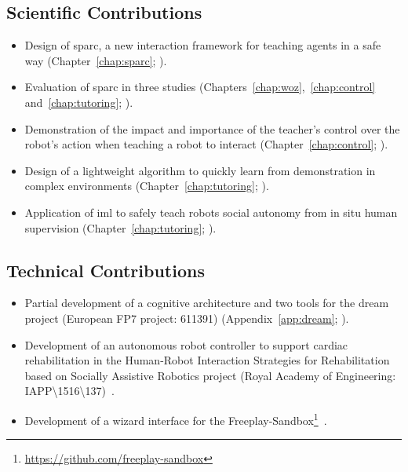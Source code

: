 \subsection{Scientific Contributions}
\begin{itemize}
	\item Design of \gls{sparc}, a new interaction framework for teaching agents in a safe way (Chapter~\ref{chap:sparc}; \citealt{senft2015human,senft2015sparc}).
	\item Evaluation of \gls{sparc} in three studies (Chapters~\ref{chap:woz},~\ref{chap:control} and~\ref{chap:tutoring}; \citealt{senft2015sparc,senft2017supervised,senft2018robots}).
	\item Demonstration of the impact and importance of the teacher's control over the robot's action when teaching a robot to interact (Chapter~\ref{chap:control}; \citealt{senft2016sparc,senft2017supervised}).
	\item Design of a lightweight algorithm to quickly learn from demonstration in complex environments (Chapter~\ref{chap:tutoring}; \citealt{senft2017toward}).
	\item Application of \gls{iml} to safely teach robots social autonomy from in situ human supervision (Chapter~\ref{chap:tutoring}; \citealt{senft2018robots}).
\end{itemize}

\subsection{Technical Contributions}
\begin{itemize}
	\item Partial development of a cognitive architecture and two tools for the \acrshort{dream} project (European FP7 project: 611391) (Appendix~\ref{app:dream}; \citep{esteban2017build}).
	\item Development of an autonomous robot controller to support cardiac rehabilitation in the Human-Robot Interaction Strategies for Rehabilitation based on Socially Assistive Robotics project (Royal Academy of Engineering: IAPP\textbackslash1516\textbackslash137)~\citep{lara2017human,casas2018social}.
	\item Development of a wizard interface for the Freeplay-Sandbox\footnote{\url{https://github.com/freeplay-sandbox}}~\citep{lemaignan2017free}.
\end{itemize}
	
